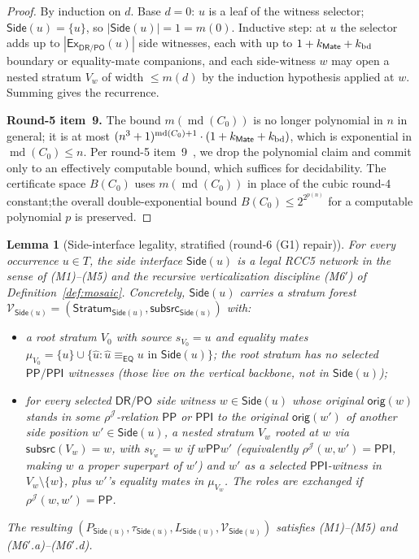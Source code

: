 \documentclass[11pt]{article}
\newtheorem{lemma}[theorem]{Lemma}
\newcommand{\EQ}{\mathsf{EQ}}
\newcommand{\DR}{\mathsf{DR}}
\newcommand{\PO}{\mathsf{PO}}
\newcommand{\PP}{\mathsf{PP}}
\newcommand{\PPI}{\mathsf{PPI}}
\newcommand{\Ex}{\mathsf{Ex}}
\newcommand{\J}{\mathcal J}
\newcommand{\orig}{\mathsf{orig}}
\newcommand{\Mate}{\mathsf{Mate}}
\newcommand{\eqc}{\equiv_{\EQ}}
\newcommand{\Stratum}{\mathsf{Stratum}}
\newcommand{\Side}{\mathsf{Side}}
\newcommand{\Subsrc}{\mathsf{subsrc}}
\newcommand{\md}{\operatorname{md}}
\begin{document}
\begin{proof}
By induction on $d$.  Base $d=0$: $u$ is a leaf of the witness
selector;\@ $\Side(u)=\{u\}$, so $|\Side(u)|=1=m(0)$.  Inductive
step: at $u$ the selector adds up to $|\Ex_{\DR/\PO}(u)|$ side
witnesses, each with up to $1+k_{\Mate}+k_{\rm bd}$ boundary or
equality-mate companions, and each side-witness $w$ may open a
nested stratum $V_w$ of width $\le m(d)$ by the induction
hypothesis applied at $w$.  Summing gives the recurrence.

\textbf{Round-5 item~9.}  The bound $m(\md(C_0))$ is no longer
polynomial in $n$ in general; it is at most $(n^3+1)^{\md(C_0)+1}
\cdot(1+k_{\Mate}+k_{\rm bd})$, which is exponential in
$\md(C_0)\le n$.  Per round-5 item~9~\cite{GPT55Round5Review}, we
drop the polynomial claim and commit only to an effectively
computable bound, which suffices for decidability.  The certificate
space $B(C_0)$ uses $m(\md(C_0))$ in place of the cubic round-4
constant;\@ the overall double-exponential bound $B(C_0)\le
2^{2^{p(n)}}$ for a computable polynomial $p$ is preserved.
\end{proof}

\begin{lemma}[Side-interface legality, stratified (round-6 (G1) repair)]\label{lem:side-placement}
For every occurrence $u\in T$, the side interface $\Side(u)$ is a
legal RCC5 network in the sense of (M1)--(M5) and the recursive
verticalization discipline (M6$'$) of
Definition~\ref{def:mosaic}.  Concretely, $\Side(u)$ carries a
\emph{stratum forest}
\(
  \mathcal V_{\Side(u)}=(\Stratum_{\Side(u)},\Subsrc_{\Side(u)})
\)
with:
\begin{itemize}
\item a root stratum $V_0$ with source $s_{V_0}=u$ and equality
  mates $\mu_{V_0}=\{u\}\cup\{\widehat u:\widehat u\eqc u\text{ in
  }\Side(u)\}$; the root stratum has no selected $\PP/\PPI$
  witnesses (those live on the vertical backbone, not in
  $\Side(u)$);
\item for every selected $\DR/\PO$ side witness $w\in\Side(u)$
  whose original $\orig(w)$ stands in some $\rho^\J$-relation
  $\PP$ or $\PPI$ to the original $\orig(w')$ of another side
  position $w'\in\Side(u)$, a \emph{nested stratum} $V_w$ rooted at
  $w$ via $\Subsrc(V_w)=w$, with $s_{V_w}=w$ if $w\PP w'$
  (equivalently $\rho^\J(w,w')=\PPI$, making $w$ a proper
  superpart of $w'$) and $w'$ as a selected $\PPI$-witness in
  $V_w\setminus\{w\}$, plus $w'$'s equality mates in $\mu_{V_w}$.
  The roles are exchanged if $\rho^\J(w,w')=\PP$.
\end{itemize}
The resulting $(P_{\Side(u)},\tau_{\Side(u)},L_{\Side(u)},
\mathcal V_{\Side(u)})$ satisfies (M1)--(M5) and (M6$'$.a)--(M6$'$.d).
\end{lemma}
\end{document}
